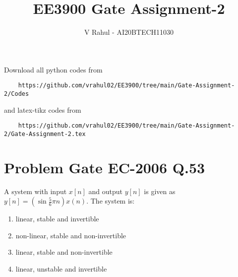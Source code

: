 \documentclass[journal,12pt,twocolumn]{IEEEtran}
\begin{document}
\title{EE3900 Gate Assignment-2}
\author{V Rahul - AI20BTECH11030}
\maketitle
\newpage
\bigskip
\renewcommand{\thefigure}{\theenumi}
\renewcommand{\thetable}{\theenumi}
Download all python codes from 
\begin{lstlisting}
    https://github.com/vrahul02/EE3900/tree/main/Gate-Assignment-2/Codes
\end{lstlisting}
%
and latex-tikz codes from 
%
\begin{lstlisting}
    https://github.com/vrahul02/EE3900/tree/main/Gate-Assignment-2/Gate-Assignment-2.tex
\end{lstlisting}
\section*{Problem Gate EC-2006 Q.53}
A system with input $x[n]$ and output $y[n]$ is given as $y[n]=\left(\sin{\frac{5}{6}\pi n}\right) x(n)$. The system is:\\
\begin{enumerate}
    \item linear, stable and invertible
    \item non-linear, stable and non-invertible
    \item linear, stable and non-invertible
    \item linear, unstable and invertible
\end{enumerate}
\end{document}
